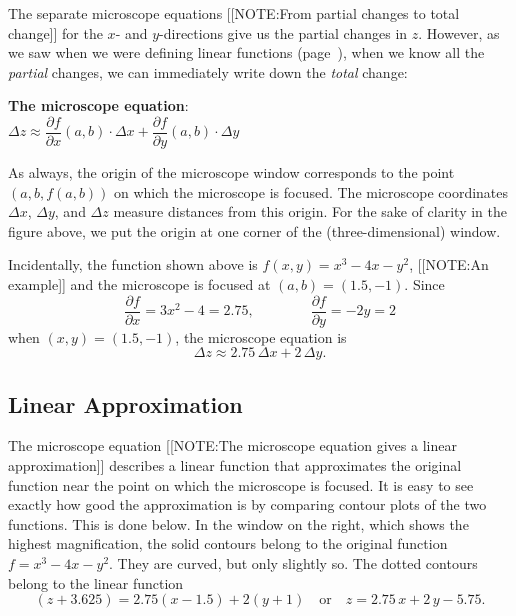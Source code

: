 The separate microscope equations 
[[NOTE:From partial changes  to total change]]	
for the $x$- and $y$-directions give us the partial changes in $z$.
However, as we saw when we were defining linear functions
(page~\pageref{altdef}), when we know all the {\em partial\/}
changes, we can immediately write down the {\em
  total\/} change:
\begin{observation}

{\bf The microscope equation}: \\
$\Delta z \approx 
	\dfrac{\partial f}{\partial x}(a, b) \cdot \Delta x
	+ \dfrac{\partial f}{\partial y}(a, b) \cdot \Delta y$
\end{observation}

As always, the origin of the microscope window corresponds to the
point $(a, b, f(a, b))$ on which the microscope is focused.  The
microscope coordinates $\Delta x$, $\Delta y$, and $\Delta z$ measure
distances from this origin.  For the sake of clarity in the figure
above, we put the origin at one corner of the (three-dimensional)
window.

Incidentally, the function shown above is $f(x, y) = x^3 - 4x - y^2$, 
[[NOTE:An example]]	
and the microscope is focused at $(a, b) = (1.5, -1)$.  Since
	\[
\dfrac{\partial f}{\partial x} = 3 x^2 - 4 = 2.75, \qquad \qquad
		\dfrac{\partial f}{\partial y} = -2 y = 2
\]
when $(x, y) = (1.5, -1)$, the microscope equation is
	\[
\Delta z \approx 2.75 \, \Delta x + 2 \, \Delta y.
\]

\subsection{Linear Approximation}
\label{subsec:linear-approximation}

The microscope equation 
[[NOTE:The microscope equation gives  a linear approximation]]	
describes a linear function that approximates the original function
near the point on which the microscope is focused.  It is easy to see
exactly how good the approximation is by comparing contour plots of
the two functions.  This is done below.  In the window on the right,
which shows the highest magnification, the solid contours belong to
the original function $f = x^3 - 4x - y^2$.  They are curved, but only
slightly so.  The dotted contours belong to the linear function
	\[
(z + 3.625) = 2.75 (x - 1.5) + 2 (y + 1) \quad \mbox{or} \quad
		z = 2.75 \, x + 2 \, y - 5.75.
\] 

